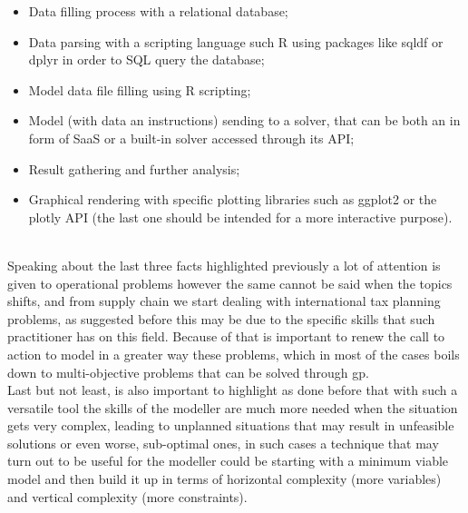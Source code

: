 \begin{doublespace}
\begin{itemize}
    \item Data filling process with a relational database;
    \item Data parsing with a scripting language such R using packages like sqldf\cite{Rsqldf_2017} or dplyr\cite{Rdplyr} in order to SQL query the database;
    \item Model data file filling using R scripting;
    \item Model (with data an instructions) sending to a solver, that can be both an in form of SaaS or a built-in solver accessed through its API;
    \item Result gathering and further analysis; 
    \item Graphical rendering with specific plotting libraries such as ggplot2\cite{Rggplot2_2009} or the plotly\cite{Rplotly_2017} API (the last one should be intended for a more interactive purpose).
\end{itemize}
\\
Speaking about the last three facts highlighted previously a lot of attention is given to operational problems however the same cannot be said when the topics shifts, and from supply chain we start dealing with international tax planning problems, as suggested before this may be due to the specific skills that such practitioner has on this field. Because of that is important to renew the call to action to model in a greater way these problems, which in most of the cases boils down to multi-objective problems that can be solved through \gls{gp}.
\\
Last but not least, is also important to highlight as done before that with such a versatile tool the skills of the modeller are much more needed when the situation gets very complex, leading to unplanned situations that may result in unfeasible solutions or even worse, sub-optimal ones, in such cases a technique that may turn out to be useful for the modeller could be starting with a minimum viable model and then build it up in terms of horizontal complexity (more variables) and vertical complexity (more constraints).

\pagebreak

\end{doublespace}
